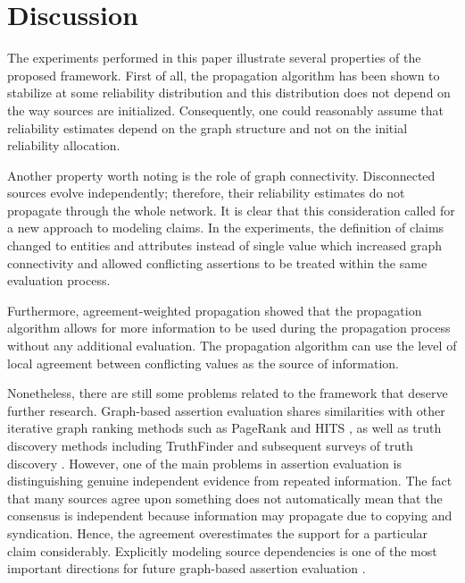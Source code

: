 \section{Discussion}

The experiments performed in this paper illustrate several properties of the proposed framework. First of all, the propagation algorithm has been shown to stabilize at some reliability distribution and this distribution does not depend on the way sources are initialized. Consequently, one could reasonably assume that reliability estimates depend on the graph structure and not on the initial reliability allocation.

Another property worth noting is the role of graph connectivity. Disconnected sources evolve independently; therefore, their reliability estimates do not propagate through the whole network. It is clear that this consideration called for a new approach to modeling claims. In the experiments, the definition of claims changed to entities and attributes instead of single value which increased graph connectivity and allowed conflicting assertions to be treated within the same evaluation process.

Furthermore, agreement-weighted propagation showed that the propagation algorithm allows for more information to be used during the propagation process without any additional evaluation. The propagation algorithm can use the level of local agreement between conflicting values as the source of information.

Nonetheless, there are still some problems related to the framework that deserve further research. Graph-based assertion evaluation shares similarities with other iterative graph ranking methods such as PageRank \cite{brin1998anatomy} and HITS \cite{kleinberg1999authoritative}, as well as truth discovery methods including TruthFinder \cite{yin2008truthfinder} and subsequent surveys of truth discovery \cite{li2016survey}. However, one of the main problems in assertion evaluation is distinguishing genuine independent evidence from repeated information. The fact that many sources agree upon something does not automatically mean that the consensus is independent because information may propagate due to copying and syndication. Hence, the agreement overestimates the support for a particular claim considerably. Explicitly modeling source dependencies is one of the most important directions for future graph-based assertion evaluation \cite{dong2009integrating}.
